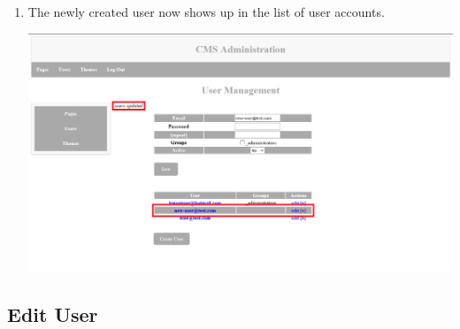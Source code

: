 \documentclass[12pt]{article}
\begin{document}
\begin{enumerate}
  \pagebreak
  
  \item The newly created user now shows up in the list of user accounts.
  
  \includegraphics[width=\textwidth,height=\textheight,keepaspectratio]{pics/createBasicUser_7.png}
  
\end{enumerate}


\subsection{Edit User}
\end{document}
